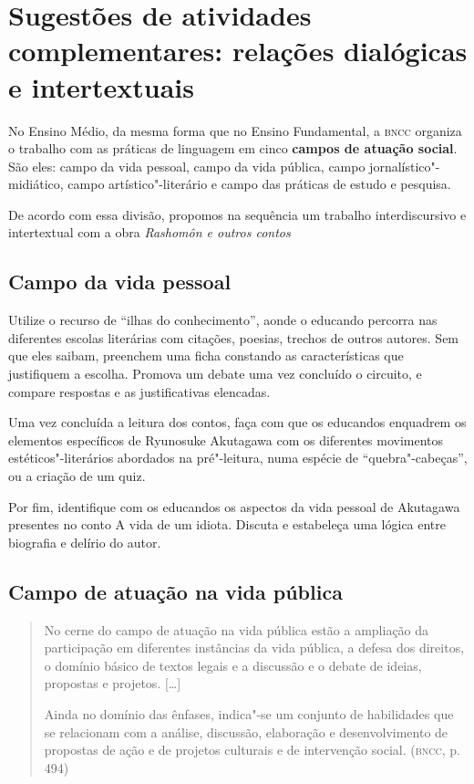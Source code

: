 \documentclass[12pt]{extarticle}
\begin{document}
\section{Sugestões de atividades complementares: relações dialógicas e
intertextuais}


No Ensino Médio, da mesma forma que no Ensino Fundamental, a \textsc{bncc}
organiza o trabalho com as práticas de linguagem em cinco \textbf{campos de
atuação social}. São eles: campo da vida pessoal, campo da vida pública, campo
jornalístico"-midiático, campo artístico"-literário e campo das práticas de
estudo e pesquisa.

De acordo com essa divisão, propomos na sequência um trabalho interdiscursivo e
intertextual com a obra \emph{Rashomôn e outros contos}

\subsection{Campo da vida pessoal}

Utilize o recurso de ``ilhas do conhecimento'', aonde o educando percorra nas
diferentes escolas literárias com citações, poesias, trechos de outros autores.
Sem que eles saibam, preenchem uma ficha constando as características que
justifiquem a escolha. Promova um debate uma vez concluído o circuito, e
compare respostas e as justificativas elencadas.

Uma vez concluída a leitura dos contos, faça com que os educandos enquadrem os
elementos específicos de Ryunosuke Akutagawa com os diferentes movimentos
estéticos"-literários abordados na pré"-leitura, numa espécie de
``quebra"-cabeças'', ou a criação de um quiz.

Por fim, identifique com os educandos os aspectos da vida pessoal de Akutagawa
presentes no conto A vida de um idiota. Discuta e estabeleça uma lógica entre
biografia e delírio do autor.

\subsection{Campo de atuação na vida pública}

\begin{quote} No cerne do campo de atuação na vida pública estão a ampliação da
  participação em diferentes instâncias da vida pública, a defesa dos direitos,
  o domínio básico de textos legais e a discussão e o debate de ideias,
  propostas e projetos. {[}\ldots{}{]}

Ainda no domínio das ênfases, indica"-se um conjunto de habilidades que se
relacionam com a análise, discussão, elaboração e desenvolvimento de propostas
de ação e de projetos culturais e de intervenção social.  (\textsc{bncc}, p.
494) \end{quote}
\end{document}
